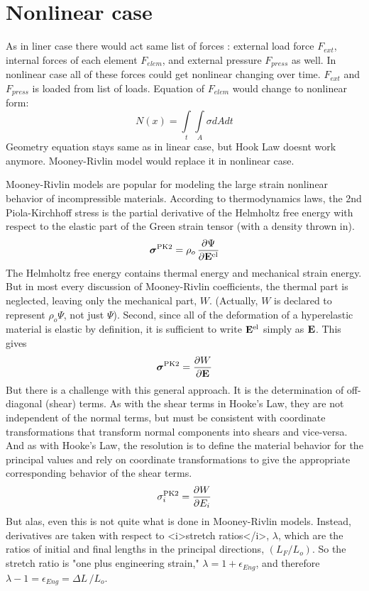 \documentclass[12pt]{report}
\begin{document}
\section{Nonlinear case}
As in liner case there would act same list of forces : external load force $F_{ext}$,
internal forces of each element $F_{elem}$, and external pressure $F_{press}$ as well. In nonlinear case all 
of these forces could get nonlinear changing over time. $F_{ext}$ and $F_{press}$ is 
loaded from list of loads. Equation of $F_{elem}$ would change to nonlinear form:
\begin{equation}\label{eqn:nNx}
  N(x)= \int\limits_t\int\limits_A \sigma dAdt
\end{equation}
Geometry equation stays same as in linear case, but Hook Law doesnt work anymore. Mooney-Rivlin model would 
replace it in nonlinear case.\par
Mooney-Rivlin models are popular for modeling the large strain nonlinear behavior of incompressible materials. 
According to thermodynamics laws, the 2nd Piola-Kirchhoff stress is the partial derivative of the 
Helmholtz free energy with respect to the elastic part of the Green strain tensor (with a density thrown in).
\[
\boldsymbol{\sigma}^\text{PK2} = \rho_o \, {\partial \Psi \over \partial {\bf E}^\text{el} }
\]
The Helmholtz free energy contains thermal energy and mechanical strain energy.  
But in most every discussion of Mooney-Rivlin coefficients, the thermal
part is neglected, leaving only the mechanical part, \(W\).  (Actually, \(W\)
is declared to represent \(\rho_o \Psi\), not just \(\Psi\)).  Second, since 
all of the deformation of a hyperelastic material is elastic by definition,
it is sufficient to write \({\bf E}^\text{el}\) simply as \({\bf E}\).
This gives
\[
\boldsymbol{\sigma}^\text{PK2} = {\partial W \over \partial {\bf E} }
\]
But there is a challenge with this general approach.  It is the determination
of off-diagonal (shear) terms.  As with the shear terms in Hooke's Law, they
are not independent of the normal terms, but must be consistent with coordinate
transformations that transform normal components into shears and vice-versa.
And as with Hooke's Law, the resolution is to define the material behavior
for the principal values and rely on coordinate transformations to give
the appropriate corresponding behavior of the shear terms.
\[
\sigma_i^\text{PK2} = {\partial W \over \partial E_i }
\]
But alas, even this is not quite what is done in Mooney-Rivlin models.  Instead, derivatives
are taken with respect to <i>stretch ratios</i>, \(\lambda\), which are 
the ratios of initial and final lengths in the principal directions, 
\((L_F / L_o)\).  So the stretch ratio is
"one plus engineering strain,"  \(\lambda = 1 + \epsilon_{Eng}\), and 
therefore \(\lambda - 1 = \epsilon_{Eng} = \Delta L \, / L_o\).
\end{document}
